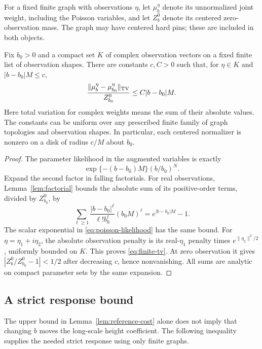 For a fixed finite graph with observations $\eta$, let $\mu_b^\eta$
denote its unnormalized joint weight, including the Poisson variables,
and let $Z_b^0$ denote its centered zero-observation mass.  The graph may
have centered hard pins; these are included in both objects.

\begin{lemma}\label{lem:finite-perturbation}
Fix $b_0>0$ and a compact set $K$ of complex observation vectors on a
fixed finite list of observation shapes.  There are constants $c,C>0$
such that, for $\eta\in K$ and $|b-b_0|M\le c$,
\begin{equation}\label{eq:finite-tv}
 \frac{\|\mu_b^\eta-\mu_{b_0}^\eta\|_{\rm TV}}{Z_{b_0}^0}
                   \le C|b-b_0|M.
\end{equation}
Here total variation for complex weights means the sum of their absolute
values.  The constants can be uniform over any prescribed finite family
of graph topologies and observation shapes.  In particular, each
centered normalizer is nonzero on a disk of radius $c/M$ about $b_0$.
\end{lemma}

\begin{proof}
The parameter likelihood in the augmented variables is exactly
\begin{equation}\label{eq:poisson-likelihood}
       \exp\{-(b-b_0)M\}(b/b_0)^N.
\end{equation}
Expand the second factor in falling factorials.  For real observations,
Lemma~\ref{lem:factorial} bounds the absolute sum of its positive-order
terms, divided by $Z_{b_0}^0$, by
\[
 \sum_{\ell\ge1}\frac{|b-b_0|^\ell}{\ell!b_0^\ell}(b_0M)^\ell
                  =e^{|b-b_0|M}-1.
\]
The scalar exponential in \eqref{eq:poisson-likelihood} has the same
bound.  For $\eta=\eta_1+i\eta_2$, the absolute observation penalty is
its real-$\eta_1$ penalty times $e^{\|\eta_2\|^2/2}$, uniformly bounded
on $K$.  This proves \eqref{eq:finite-tv}.  At zero observation it gives
$|Z_b^0/Z_{b_0}^0-1|<1/2$ after decreasing $c$, hence nonvanishing.
All sums are analytic on compact parameter sets by the same expansion.
\end{proof}

\subsection{A strict response bound}

The upper bound in Lemma~\ref{lem:reference-cost} alone does not imply
that changing $b$ moves the long-scale height coefficient.  The following
inequality supplies the needed strict response using only finite graphs.

